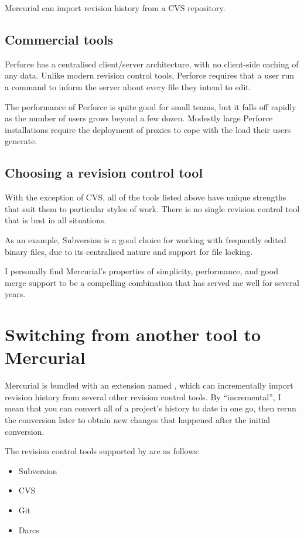 Mercurial can import revision history from a CVS repository.


\subsection{Commercial tools}

Perforce has a centralised client/server architecture, with no
client-side caching of any data.  Unlike modern revision control
tools, Perforce requires that a user run a command to inform the
server about every file they intend to edit.

The performance of Perforce is quite good for small teams, but it
falls off rapidly as the number of users grows beyond a few dozen.
Modestly large Perforce installations require the deployment of
proxies to cope with the load their users generate.


\subsection{Choosing a revision control tool}

With the exception of CVS, all of the tools listed above have unique
strengths that suit them to particular styles of work.  There is no
single revision control tool that is best in all situations.

As an example, Subversion is a good choice for working with frequently
edited binary files, due to its centralised nature and support for
file locking.

I personally find Mercurial's properties of simplicity, performance,
and good merge support to be a compelling combination that has served
me well for several years.


\section{Switching from another tool to Mercurial}

Mercurial is bundled with an extension named , which
can incrementally import revision history from several other revision
control tools.  By ``incremental'', I mean that you can convert all of
a project's history to date in one go, then rerun the conversion later
to obtain new changes that happened after the initial conversion.

The revision control tools supported by  are as
follows:
\begin{itemize}
\item Subversion
\item CVS
\item Git
\item Darcs
\end{itemize}

